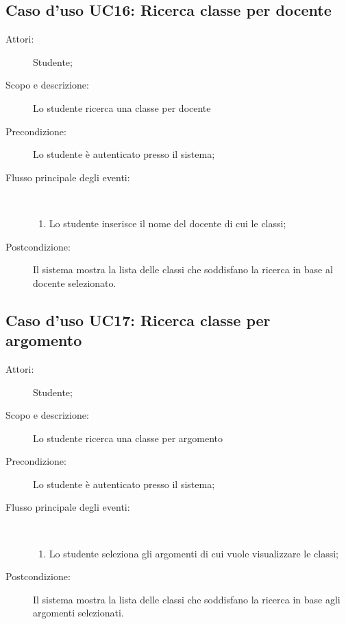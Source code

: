 \subsection{Caso d'uso UC16: Ricerca classe per docente}\begin{description}
	\item[Attori:] Studente;
	\item[Scopo e descrizione:] Lo studente ricerca una classe per docente
	\item[Precondizione:] Lo studente è autenticato presso il sistema;
	
	\item[Flusso principale degli eventi:] \ 
	\begin{enumerate}
		\item Lo studente inserisce il nome del docente di cui le classi;
		
	\end{enumerate}
	\item[Postcondizione:] Il sistema mostra la lista delle classi che soddisfano la ricerca in base al docente selezionato.
\end{description}
\hypertarget{UC17}{}
\subsection{Caso d'uso UC17: Ricerca classe per argomento}\begin{description}
	\item[Attori:] Studente;
	\item[Scopo e descrizione:] Lo studente ricerca una classe per argomento
	\item[Precondizione:] Lo studente è autenticato presso il sistema;
	
	\item[Flusso principale degli eventi:] \ 
	\begin{enumerate}
		\item Lo studente seleziona gli argomenti di cui vuole visualizzare le classi;
		
	\end{enumerate}
	\item[Postcondizione:] Il sistema mostra la lista delle classi che soddisfano la ricerca in base agli argomenti selezionati.
\end{description}
\hypertarget{UC18}{}
